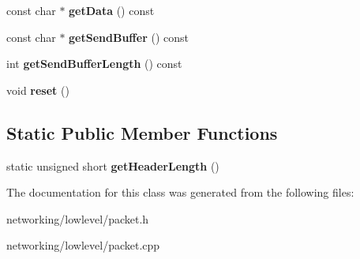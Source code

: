 \begin{DoxyCompactItemize}
\item 
const char $\ast$ {\bfseries get\+Data} () const \hypertarget{classPacket_a30b63097dfd9bbc288fa29cf30c7026a}{}\label{classPacket_a30b63097dfd9bbc288fa29cf30c7026a}

\item 
const char $\ast$ {\bfseries get\+Send\+Buffer} () const \hypertarget{classPacket_a909f7d6c72493eb472068ea332366412}{}\label{classPacket_a909f7d6c72493eb472068ea332366412}

\item 
int {\bfseries get\+Send\+Buffer\+Length} () const \hypertarget{classPacket_a0b941889db462f2139de8667abe6f59b}{}\label{classPacket_a0b941889db462f2139de8667abe6f59b}

\item 
void {\bfseries reset} ()\hypertarget{classPacket_a8d50098721348e9bc526740f402da445}{}\label{classPacket_a8d50098721348e9bc526740f402da445}

\end{DoxyCompactItemize}
\subsection*{Static Public Member Functions}
\begin{DoxyCompactItemize}
\item 
static unsigned short {\bfseries get\+Header\+Length} ()\hypertarget{classPacket_a97f5ad54362c9e66e9c4e33e99c64773}{}\label{classPacket_a97f5ad54362c9e66e9c4e33e99c64773}

\end{DoxyCompactItemize}


The documentation for this class was generated from the following files\+:\begin{DoxyCompactItemize}
\item 
networking/lowlevel/packet.\+h\item 
networking/lowlevel/packet.\+cpp\end{DoxyCompactItemize}
